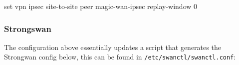 \documentclass[
]{article}
\newenvironment{Shaded}{\begin{snugshade}}{\end{snugshade}}
\newcommand{\BuiltInTok}[1]{#1}
\newcommand{\NormalTok}[1]{#1}
\newcommand{\StringTok}[1]{\textcolor[rgb]{0.31,0.60,0.02}{#1}}
\begin{document}
\begin{Shaded}
\begin{Highlighting}[numbers=left,,]
\BuiltInTok{set}\NormalTok{ vpn ipsec site{-}to{-}site peer magic{-}wan{-}ipsec replay{-}window }\StringTok{\textquotesingle{}0\textquotesingle{}}
\end{Highlighting}
\end{Shaded}

\newpage{}

\subsubsection{Strongswan}\label{strongswan}

The configuration above essentially updates a script that generates the
Strongwan config below, this can be found in
\texttt{/etc/swanctl/swanctl.conf}:
\end{document}
